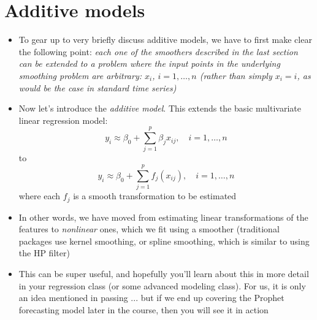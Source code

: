 \documentclass{article}
\begin{document}
\section{Additive models}

\begin{itemize}
\item To gear up to very briefly discuss additive models, we have to first
  make clear the following point: \emph{each one of the smoothers described in
    the last section can be extended to a problem where the input points in the
    underlying smoothing problem are arbitrary: $x_i$, $i = 1,\dots,n$ (rather
    than simply $x_i = i$, as would be the case in standard time series)}

\item Now let's introduce the \emph{additive model}. This extends the basic
  multivariate linear regression model:
  \[
  y_i \approx \beta_0 + \sum_{j=1}^p \beta_j x_{ij}, \quad i = 1,\dots,n
  \]
  to 
  \[
  y_i \approx \beta_0 + \sum_{j=1}^p f_j(x_{ij}), \quad i = 1,\dots,n
  \]
  where each $f_j$ is a smooth transformation to be estimated

\item In other words, we have moved from estimating linear transformations of
  the features to \emph{nonlinear} ones, which we fit using a smoother
  (traditional packages use kernel smoothing, or spline smoothing, which is
  similar to using the HP filter) 

\item This can be super useful, and hopefully you'll learn about this in more
  detail in your regression class (or some advanced modeling class). For us, it
  is only an idea mentioned in passing ... but if we end up covering the Prophet 
  forecasting model later in the course, then you will see it in action 
\end{itemize}
\end{document}
